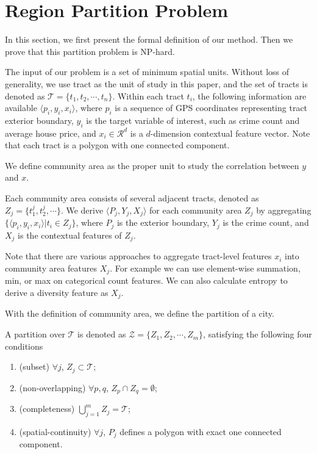 \section{Region Partition Problem}
\label{sec:problem}

In this section, we first present the formal definition of our method. Then we prove that this partition problem is NP-hard.


The input of our problem is a set of minimum spatial units. Without loss of generality, we use tract as the unit of study in this paper, and the set of tracts is denoted as $\mathcal{T} = \{ t_1, t_2, \cdots, t_n \}$. Within each tract $t_i$, the following information are available $\langle p_i, y_i, x_i \rangle$, where $p_i$ is a sequence of GPS coordinates representing tract exterior boundary, $y_i$ is the target variable of interest, such as crime count and average house price, and $x_i \in \mathcal{R}^d$ is a $d$-dimension contextual feature vector. Note that each tract is a polygon with one connected component.

We define community area as the proper unit to study the correlation between $y$ and $x$.
\begin{definition}
 Each community area consists of several adjacent tracts, denoted as $Z_j = \{t_1^j, t_2^j, \cdots \}$. We derive $\langle P_j, Y_j, X_j \rangle$ for each community area $Z_j$ by aggregating $\{ \langle p_i, y_i, x_i \rangle | t_i \in Z_j \}$, where $P_j$ is the exterior boundary, $Y_j$ is the crime count, and $X_j$ is the contextual features of $Z_j$.
\end{definition}
Note that there are various approaches to aggregate tract-level features $x_i$ into community area features $X_j$. For example we can use element-wise summation, min, or max on categorical count features. We can also calculate entropy to derive a diversity feature as $X_j$.

With the definition of community area, we define the partition of a city.
\begin{definition}[Partition]
\label{def:partition}
A partition over $\mathcal{T}$ is denoted as $\mathcal{Z} = \{ Z_1, Z_2, \cdots, Z_m\}$, satisfying the following four conditions
\begin{enumerate}
\item (subset) $\forall j$, $Z_j \subset \mathcal{T}$;
\item (non-overlapping) $\forall p, q$, $Z_p \cap Z_q = \emptyset$;
\item (completeness) $\bigcup_{j=1}^m Z_j = \mathcal{T}$;
\item (spatial-continuity) $\forall j$, $P_j$ defines a polygon with exact one connected component.
\end{enumerate}
\end{definition}

